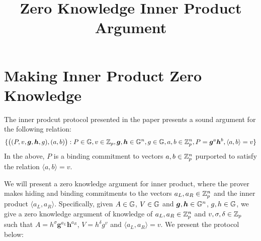 \documentclass[11pt]{article}
\title{Zero Knowledge Inner Product Argument}
\begin{document}
\maketitle


\section{Making Inner Product Zero Knowledge}
The inner prodcut protocol presented in the paper \cite[Section 3]{Bulletproofs}
presents a sound argument for the following relation:
\begin{align}\label{eq:ipa}
\{\big((P,v,\bm{g},\bm{h},g), (a,b)\big): P\in \mathbb{G}, v\in \mathbb{Z}_p,
\bm{g},\bm{h}\in \mathbb{G}^n, g\in \mathbb{G}, a,b\in \mathbb{Z}_p^n, P=\bm{g}^a\bm{h}^b,\langle
a,b\rangle = v\}
\end{align}
In the above, $P$ is a binding commitment to vectors $a,b\in \mathbb{Z}_p^n$ purported
to satisfy the relation $\langle a,b \rangle = v$.
 
We will present a zero knowledge argument for inner product, where the prover
makes hiding and binding commitments to the vectors $a_L,a_R\in \mathbb{Z}_p^n$ and  
the inner product $\langle a_L,a_R\rangle$. Specifically, given $A\in \mathbb{G}$,
$V\in \mathbb{G}$ and $\bm{g},\bm{h}\in \mathbb{G}^n$, $g,h\in \mathbb{G}$, we give a zero knowledge
argument of knowledge of $a_L,a_R\in \mathbb{Z}_p^n$ and $v,\sigma,\delta\in \mathbb{Z}_p$
such that $A=h^\sigma\bm{g}^{a_L}\bm{h}^{a_R}$, $V=h^\delta g^v$ and
$\langle a_L,a_R\rangle = v$. We present the protocol below:
\end{document}

